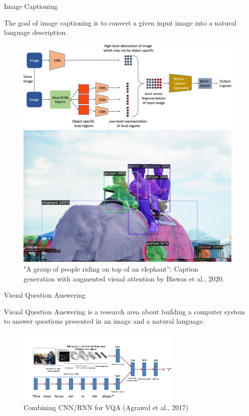 \begin{vbframe}{Image Captioning}

The goal of image captioning is to convert a given input image into a natural language description.

\begin{figure}
\centering
\begin{minipage}{.65\textwidth}
  \centering
  \includegraphics[width=.9\linewidth]{figure/caption_generation.png}
\end{minipage}%
\begin{minipage}{.35\textwidth}
  \centering
  \includegraphics[width=.9\linewidth]{figure/example_sample_generation.png}
\end{minipage}
\caption{"A group of people riding on top of an elephant”: Caption generation with augmented visual attention by Biswas et al., 2020.}
\end{figure}

\end{vbframe}


\begin{vbframe}{Visual Question Answering}

Visual Question Answering is a research area about building a computer system to answer questions presented in an image and a natural language.

    \begin{figure}
        \centering
        \includegraphics[width=8cm]{figure/VQA.png}
        \caption{Combining CNN/RNN for VQA (Agrawal et al., 2017)}
    \end{figure}


\end{vbframe}

